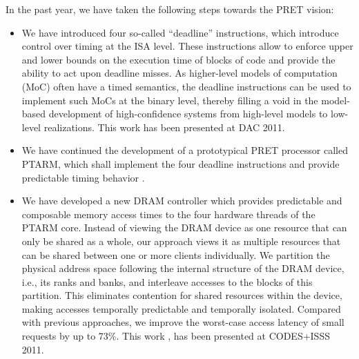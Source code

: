                In the past year, we have taken the following steps towards the PRET vision: 
               \begin{itemize}

               \item We have introduced four so-called ``deadline''
                 instructions, which introduce control over timing
                 at the ISA level. These instructions allow to
                 enforce upper and lower bounds on the execution
                 time of blocks of code and provide the ability to
                 act upon deadline misses. As higher-level models of
                 computation (MoC) often have a timed semantics, the
                 deadline instructions can be used to implement such
                 MoCs at the binary level, thereby filling a void in
                 the model-based development of high-confidence
                 systems from high-level models to low-level
                 realizations. This work
                 \cite{Reineke11_PRETDRAMControllerBankPrivatizationForPredictability}
                 has been presented at DAC 2011.

               \item We have continued the development of a
                 prototypical PRET processor called PTARM, which
                 shall implement the four deadline instructions and
                 provide predictable timing behavior \cite{LiuReinekeLee10_PRETArchitectureSupportingConcurrentProgramsWithComposable}.

               \item We have developed a new DRAM controller which
                 provides predictable and composable memory access
                 times to the four hardware threads of the PTARM
                 core. Instead of viewing the DRAM device as one
                 resource that can only be shared as a whole, our
                 approach views it as multiple resources that can be
                 shared between one or more clients individually. We
                 partition the physical address space following the
                 internal structure of the DRAM device, i.e., its
                 ranks and banks, and interleave accesses to the
                 blocks of this partition. This eliminates
                 contention for shared resources within the device,
                 making accesses temporally predictable and
                 temporally isolated. Compared with previous
                 approaches, we improve the worst-case access
                 latency of small requests by up to 73\%. This work
                 \cite{Reineke11_PRETDRAMControllerBankPrivatizationForPredictability},
                 has been presented at CODES+ISSS 2011.


\end{itemize}
